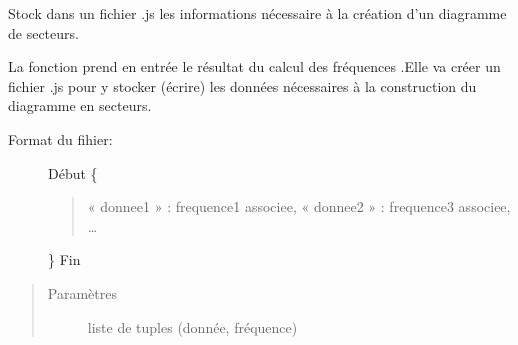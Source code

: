 \documentclass[letterpaper,10pt,openany,oneside,french]{sphinxmanual}
\begin{document}

\begin{fulllineitems}
\label{\detokenize{addQualitatives:add.addQualitatives.infoSecteurs}}
Stock dans un fichier .js les informations nécessaire à la création d’un diagramme de secteurs.

La fonction prend en entrée le résultat du calcul des fréquences .Elle va créer un fichier .js pour y stocker (écrire)
les données nécessaires à la construction du diagramme en secteurs.
\begin{description}
\item[{Format du fihier:}] \leavevmode
Début
\{
\begin{quote}

« donnee1 » : frequence1 associee,
« donnee2 » : frequence3 associee,
…
\end{quote}

\}
Fin

\end{description}
\begin{quote}\begin{description}
\item[{Paramètres}] \leavevmode
{} \textendash{} liste de tuples (donnée, fréquence)

\end{description}\end{quote}

\end{fulllineitems}

\end{document}
